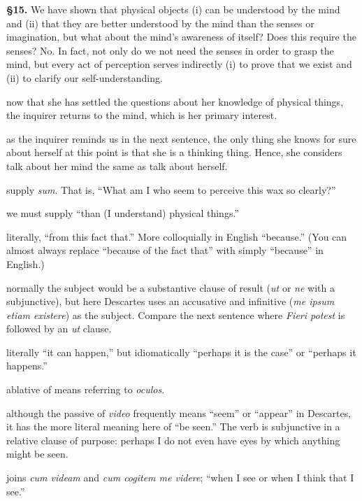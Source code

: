 \prenotes

\textbf{§15.} We have shown that physical objects (i) can be understood by the mind and (ii) that they are better understood by the mind than the senses or imagination, but what about the mind's awareness of itself? Does this require the senses? No. In fact, not only do we not need the senses in order to grasp the mind, but every act of perception serves indirectly (i) to prove that we exist and (ii) to clarify our self-understanding.

 now that she has settled the questions about her knowledge of physical things, the inquirer returns to the mind, which is her primary interest.

 as the inquirer reminds us in the next sentence, the only thing she knows for sure about herself at this point is that she is a thinking thing. Hence, she considers talk about her mind the same as talk about herself.

 supply \textit{sum}. That is, ``What am I who seem to perceive this wax so clearly?''

 we must supply ``than (I understand) physical things.''

 literally, ``from this fact that.'' More colloquially in English ``because.'' (You can almost always replace ``because of the fact that'' with simply ``because'' in English.)

 normally the subject would be a substantive clause of result (\textit{ut} or \textit{ne} with a subjunctive), but here Descartes uses an accusative and infinitive (\textit{me ipsum etiam existere}) as the subject. Compare the next sentence where \textit{Fieri potest} is followed by an \textit{ut} clause.

 literally ``it can happen,'' but idiomatically ``perhaps it is the case'' or ``perhaps it happens.''

 ablative of means referring to \textit{oculos}.

 although the passive of \textit{video} frequently means ``seem'' or ``appear'' in Descartes, it has the more literal meaning here of ``be seen.'' The verb is subjunctive in a relative clause of purpose: perhaps I do not even have eyes by which anything might be seen.

 joins \textit{cum videam} and \textit{cum cogitem me videre}; ``when I see or when I think that I see.''

